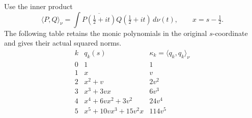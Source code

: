 Use the inner product
\[
 \langle P,Q\rangle_\nu
  =\int\overline{P(\tfrac12+it)}Q(\tfrac12+it)\,d\nu(t),
 \qquad x=s-\tfrac12.                                           \tag{TEC.6}
\]
The following table retains the monic polynomials in the original
\(s\)-coordinate and gives their actual squared norms.
\[
\begin{array}{c|l|c}
k&q_k(s)&\kappa_k=\langle q_k,q_k\rangle_\nu\\\hline
0&1&1\\
1&x&v\\
2&x^2+v&2v^2\\
3&x^3+3vx&6v^3\\
4&x^4+6vx^2+3v^2&24v^4\\
5&x^5+10vx^3+15v^2x&114v^5
\end{array}                                                       \tag{TEC.7}
\]

